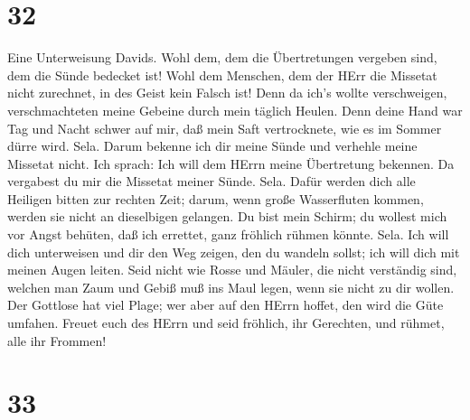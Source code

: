 \hypertarget{section-31}{%
\section{32}\label{section-31}}

 Eine Unterweisung Davids. Wohl dem, dem die Übertretungen
vergeben sind, dem die Sünde bedecket ist!  Wohl dem
Menschen, dem der HErr die Missetat nicht zurechnet, in des Geist kein
Falsch ist!  Denn da ich's wollte verschweigen,
verschmachteten meine Gebeine durch mein täglich Heulen. 
Denn deine Hand war Tag und Nacht schwer auf mir, daß mein Saft
vertrocknete, wie es im Sommer dürre wird. Sela.  Darum
bekenne ich dir meine Sünde und verhehle meine Missetat nicht. Ich
sprach: Ich will dem HErrn meine Übertretung bekennen. Da vergabest du
mir die Missetat meiner Sünde. Sela.  Dafür werden dich alle
Heiligen bitten zur rechten Zeit; darum, wenn große Wasserfluten kommen,
werden sie nicht an dieselbigen gelangen.  Du bist mein
Schirm; du wollest mich vor Angst behüten, daß ich errettet, ganz
fröhlich rühmen könnte. Sela.  Ich will dich unterweisen und
dir den Weg zeigen, den du wandeln sollst; ich will dich mit meinen
Augen leiten.  Seid nicht wie Rosse und Mäuler, die nicht
verständig sind, welchen man Zaum und Gebiß muß ins Maul legen, wenn sie
nicht zu dir wollen.  Der Gottlose hat viel Plage; wer aber
auf den HErrn hoffet, den wird die Güte umfahen.  Freuet
euch des HErrn und seid fröhlich, ihr Gerechten, und rühmet, alle ihr
Frommen!

\hypertarget{section-32}{%
\section{33}\label{section-32}}

